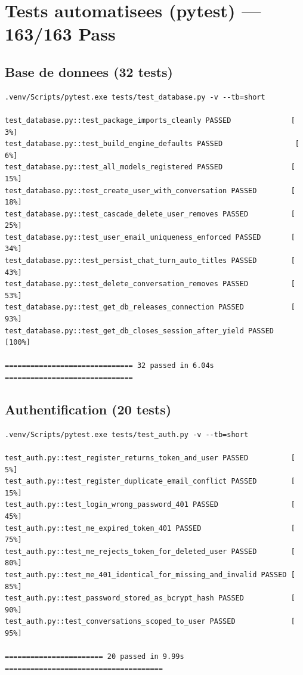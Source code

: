 \documentclass[12pt,a4paper,oneside]{article}
\begin{document}
\clearpage

\section{Tests automatisees (pytest) --- 163/163 Pass}

\subsection{Base de donnees (32 tests)}

\begin{verbatim}
.venv/Scripts/pytest.exe tests/test_database.py -v --tb=short

test_database.py::test_package_imports_cleanly PASSED              [  3%]
test_database.py::test_build_engine_defaults PASSED                 [  6%]
test_database.py::test_all_models_registered PASSED                [ 15%]
test_database.py::test_create_user_with_conversation PASSED        [ 18%]
test_database.py::test_cascade_delete_user_removes PASSED          [ 25%]
test_database.py::test_user_email_uniqueness_enforced PASSED       [ 34%]
test_database.py::test_persist_chat_turn_auto_titles PASSED        [ 43%]
test_database.py::test_delete_conversation_removes PASSED          [ 53%]
test_database.py::test_get_db_releases_connection PASSED           [ 93%]
test_database.py::test_get_db_closes_session_after_yield PASSED   [100%]

============================== 32 passed in 6.04s ==============================
\end{verbatim}

\subsection{Authentification (20 tests)}

\begin{verbatim}
.venv/Scripts/pytest.exe tests/test_auth.py -v --tb=short

test_auth.py::test_register_returns_token_and_user PASSED          [  5%]
test_auth.py::test_register_duplicate_email_conflict PASSED        [ 15%]
test_auth.py::test_login_wrong_password_401 PASSED                 [ 45%]
test_auth.py::test_me_expired_token_401 PASSED                     [ 75%]
test_auth.py::test_me_rejects_token_for_deleted_user PASSED        [ 80%]
test_auth.py::test_me_401_identical_for_missing_and_invalid PASSED [ 85%]
test_auth.py::test_password_stored_as_bcrypt_hash PASSED           [ 90%]
test_auth.py::test_conversations_scoped_to_user PASSED             [ 95%]

======================= 20 passed in 9.99s =====================================
\end{verbatim}
\end{document}
